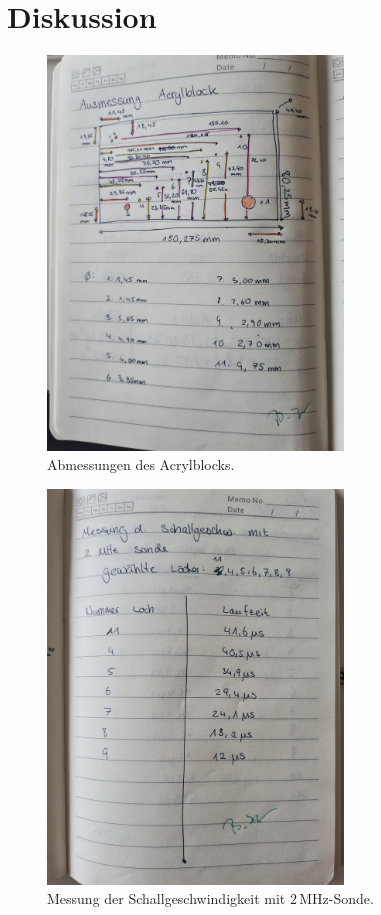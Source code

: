 \section{Diskussion}
\label{sec:Diskussion}

\label{sec:Anhang}
\begin{figure}
    \centering
    \includegraphics[width=0.7\textwidth]{messwerte/index.jpg}
    \caption{Abmessungen des Acrylblocks.}
\end{figure}

\begin{figure}
    \centering
    \includegraphics[width=0.7\textwidth]{messwerte/index2.jpg}
    \caption{Messung der Schallgeschwindigkeit mit $2\,\unit{\mega\hertz}$-Sonde.}
\end{figure}

